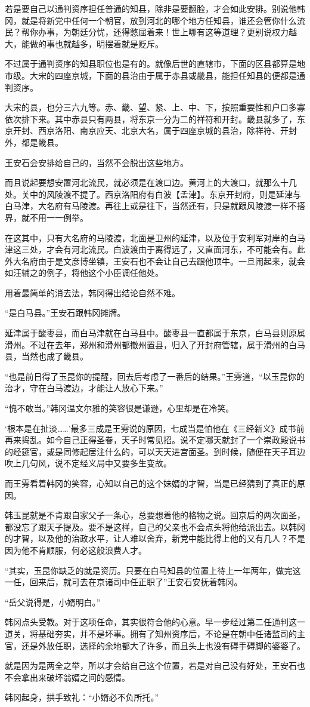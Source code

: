 若是要自己以通判资序担任普通的知县，除非是要翻脸，才会如此安排。别说他韩冈，就是将新党中任何一个朝官，放到河北的哪个地方任知县，谁还会管你什么流民？帮你办事，为朝廷分忧，还得憋屈着来！世上哪有这等道理？更别说权力越大，能做的事也就越多，明摆着就是贬斥。

不过属于通判资序的知县职位也是有的。就像后世的直辖市，下面的区县都算是地市级。大宋的四座京城，下面的县治由于属于赤县或畿县，能担任知县的便都是通判资序。

大宋的县，也分三六九等。赤、畿、望、紧、上、中、下，按照重要性和户口多寡依次排下来。其中赤县只有两县，将东京一分为二的祥符和开封。畿县就多了，东京开封、西京洛阳、南京应天、北京大名，属于四座京城的县治，除祥符、开封外，都是畿县。

王安石会安排给自己的，当然不会脱出这些地方。

而且说起要想安置河北流民，就必须是在渡口边。黄河上的大渡口，就那么十几处。关中的风陵渡不提了。西京洛阳府有白波【孟津】。东京开封府，则是延津与白马津，大名府有马陵渡。再往上或是往下，当然还有，只是就跟风陵渡一样不搭界，就不用一一例举。

在这其中，只有大名府的马陵渡，北面是卫州的延津，以及位于安利军对岸的白马津这三处，才会有河北流民。白波渡由于离得远了，又直面河东，不可能会有。此外大名府由于是文彦博坐镇，王安石也不会让自己去跟他顶牛。一旦闹起来，就会如汪辅之的例子，将他这个小臣调任他处。

用着最简单的消去法，韩冈得出结论自然不难。

“是白马县。”王安石跟韩冈摊牌。

延津属于酸枣县，而白马津就在白马县中。酸枣县一直都属于东京，白马县则原属滑州。不过在去年，郑州和滑州都撤州置县，归入了开封府管辖，属于滑州的白马县，当然也成了畿县。

“也是前日得了玉昆你的提醒，回去后考虑了一番后的结果。”王雱道，“以玉昆你的治才，守在白马渡边，才能让人放心下来。”

“愧不敢当。”韩冈温文尔雅的笑容很是谦逊，心里却是在冷笑。

‘根本是在扯淡……’最多三成是王雱说的原因，七成当是怕他在《三经新义》成书前再来捣乱。如今自己正得圣眷，天子时常见招。说不定哪天就封了一个崇政殿说书的经筵官，或是同修起居注什么的，可以天天进宫面圣。到时候，随便在天子耳边吹上几句风，说不定经义局中又要多生变故。

而王雱看着韩冈的笑容，心知以自己的这个妹婿的才智，当是已经猜到了真正的原因。

韩玉昆就是不肯跟自家父子一条心，总要想着他的格物之说。回京后的两次面圣，都没忘了跟天子提及。要不是这样，自己的父亲也不会点头将他给派出去。以韩冈的才智，以及他的治政水平，让人难以舍弃，新党中能比得上他的又有几人？不是因为他不肯顺服，何必这般浪费人才。

“其实，玉昆你缺乏的就是资历。只要在白马知县的位置上待上一年两年，做完这一任，回来后，就可去在京诸司中任正职了”王安石安抚着韩冈。

“岳父说得是，小婿明白。”

韩冈点头受教。对于这项任命，其实很符合他的心意。早一步经过第二任通判这一道关，将基础夯实，并不是坏事。拥有了知州资序后，不论是在朝中任诸监司的主官，还是外放任职，选择的余地都大了许多，而且头上也没有碍手碍脚的婆婆了。

就是因为是两全之举，所以才会给自己这个位置，若是对自己没有好处，王安石也不会拿出来破坏翁婿之间的感情。

韩冈起身，拱手致礼：“小婿必不负所托。”

